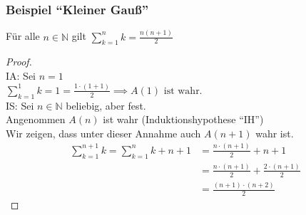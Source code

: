 \documentclass{article}
\begin{document}
    \subsubsection{Beispiel \enquote{Kleiner Gauß}}
      Für alle $n \in \mathbb{N}$ gilt $\displaystyle\sum_{k=1}^{n} k = \frac{n(n+1)}{2}$
      \begin{proof} \mbox{} \\
        IA: Sei $n = 1$ \\
        $\displaystyle\sum_{k=1}^{1} k = 1 = \frac{1 \cdot (1+1)}{2} \implies A(1) \text{ ist wahr.}$ \\
        IS: Sei $n \in \mathbb{N}$ beliebig, aber fest. \\
        Angenommen $A(n)$ ist wahr (Induktionshypothese \enquote{IH}) \\
        Wir zeigen, dass unter dieser Annahme auch $A(n+1)$ wahr ist.
        \begin{align*}
          \displaystyle\sum_{k=1}^{n+1} k = \displaystyle\sum_{k=1}^{n} k + n+1
          &= \frac{n \cdot (n+1)}{2} + n+1 \\
          &= \frac{n \cdot (n+1)}{2} + \frac{2 \cdot (n+1)}{2} \\
          &=\frac{(n+1) \cdot (n+2)}{2}
        \end{align*}
      \end{proof}
\end{document}
